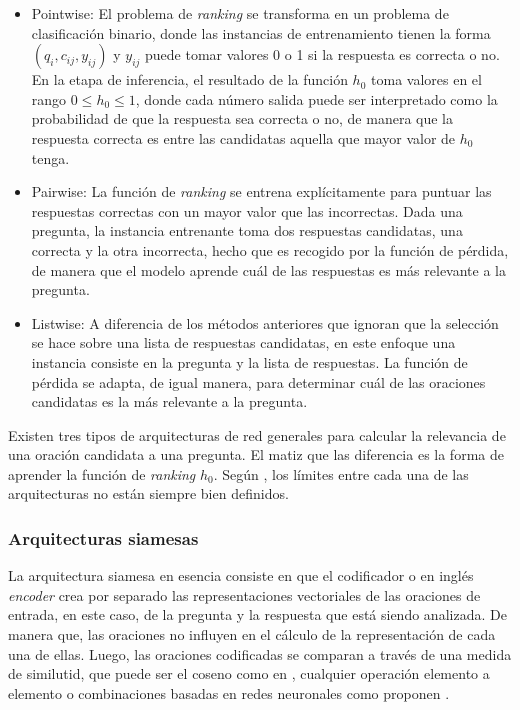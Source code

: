 \begin{itemize}
	\item Pointwise: El problema de \textit{ranking} se transforma en un problema de clasificación binario, donde las instancias de entrenamiento tienen la forma $(q_{i}, c_{ij}, y_{ij})$ y $y_{ij}$ puede tomar valores 0 o 1 si la respuesta es correcta o no. En la etapa de inferencia, el resultado de la función $h_{0}$ toma valores en el rango $0 \leq h_{0} \leq 1$, donde cada número salida puede ser interpretado como la probabilidad de que la respuesta sea correcta o no, de manera que la respuesta correcta es entre las candidatas aquella que mayor valor de $h_0$ tenga.
	\item Pairwise: La función de \textit{ranking} se entrena explícitamente para puntuar las respuestas correctas con un mayor valor que las incorrectas. Dada una pregunta, la instancia entrenante toma dos respuestas candidatas, una correcta y la otra incorrecta, hecho que es recogido por la función de pérdida, de manera que el modelo aprende cuál de las respuestas es más relevante a la pregunta. 
	\item Listwise: A diferencia de los métodos anteriores que ignoran que la selección se hace sobre una lista de respuestas candidatas, en este enfoque una instancia consiste en la pregunta y la lista de respuestas. La función de pérdida se adapta, de igual manera, para determinar cuál de las oraciones candidatas es la más relevante a la pregunta.
\end{itemize}

Existen tres tipos de arquitecturas de red generales para calcular la relevancia de una oración candidata a una pregunta. El matiz que las diferencia es la forma de aprender la función de \textit{ranking} $h_{0}$. Según \cite{2018-lai-review}, los límites entre cada una de las arquitecturas no están siempre bien definidos.

\subsubsection{Arquitecturas siamesas}

La arquitectura siamesa en esencia consiste en que el codificador o en inglés \textit{encoder} crea por separado las representaciones vectoriales de las oraciones de entrada, en este caso, de la pregunta y la respuesta que está siendo analizada. De manera que, las oraciones no influyen en el cálculo de la representación de cada una de ellas. Luego, las oraciones codificadas se comparan a través de una medida de similutid, que puede ser el coseno como en \cite{2015-feng-siamese-cosine}, cualquier operación elemento a elemento \cite{2015-tai-element-wise} o combinaciones basadas en redes neuronales como proponen \cite{2015-manning-inference}.

